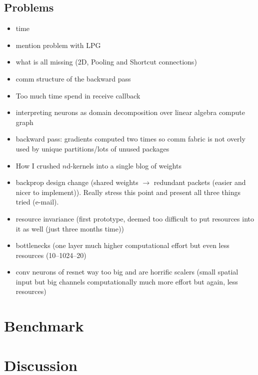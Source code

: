 \documentclass[]{article}
\begin{document}


\subsection{Problems} %
\label{subsec:problems}

\begin{itemize}
  \item time
  \item mention problem with LPG
  \item what is all missing (2D, Pooling and Shortcut connections)
  \item comm structure of the backward pass
  \item Too much time spend in receive callback
  \item interpreting neurons as domain decomposition over linear algebra
    compute graph
  \item backward pass: gradients computed two times so comm fabric is
    not overly used by unique partitions/lots of unused packages
  \item How I crushed $n$d-kernels into a single blog of weights
  \item backprop design change (shared weights $\rightarrow$ redundant
    packets (easier and nicer to implement)).
    Really stress this point and present all three things tried
    (e-mail).
  \item resource invariance (first prototype, deemed too difficult
    to put resources into it as well (just three months time))
  \item bottlenecks (one layer much higher
    computational effort but even less resources (10--1024--20)
  \item conv neurons of resnet way too big and are horrific scalers
    (small spatial input but big channels computationally much more
    effort but again, less resources)
\end{itemize}




\section{Benchmark}
\label{sec:benchmark}

\section{Discussion}
\label{sec:discussion}
\end{document}
